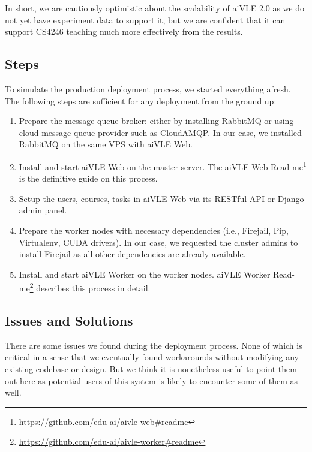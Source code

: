 In short, we are cautiously optimistic about the scalability of aiVLE 2.0 as we do not yet have experiment data to support it, but we are confident that it can support CS4246 teaching much more effectively from the results.

\subsection{Steps}
To simulate the production deployment process, we started everything afresh. The following steps are sufficient for any deployment from the ground up:

\begin{enumerate}
    \item Prepare the message queue broker: either by installing \href{https://www.rabbitmq.com/}{RabbitMQ} or using cloud message queue provider such as \href{https://www.cloudamqp.com/}{CloudAMQP}. In our case, we installed RabbitMQ on the same VPS with aiVLE Web.
    \item Install and start aiVLE Web on the master server.  The aiVLE Web Read-me\footnote{\href{https://github.com/edu-ai/aivle-web\#readme}{https://github.com/edu-ai/aivle-web\#readme}} is the definitive guide on this process.
    \item Setup the users, courses, tasks in aiVLE Web via its RESTful API or Django admin panel.
    \item Prepare the worker nodes with necessary dependencies (i.e., Firejail, Pip, Virtualenv, CUDA drivers). In our case, we requested the cluster admins to install Firejail as all other dependencies are already available.
    \item Install and start aiVLE Worker on the worker nodes. aiVLE Worker Read-me\footnote{\href{https://github.com/edu-ai/aivle-worker\#readme}{https://github.com/edu-ai/aivle-worker\#readme}} describes this process in detail.
\end{enumerate}

\subsection{Issues and Solutions}
There are some issues we found during the deployment process. None of which is critical in a sense that we eventually found workarounds without modifying any existing codebase or design. But we think it is nonetheless useful to point them out here as potential users of this system is likely to encounter some of them as well.

